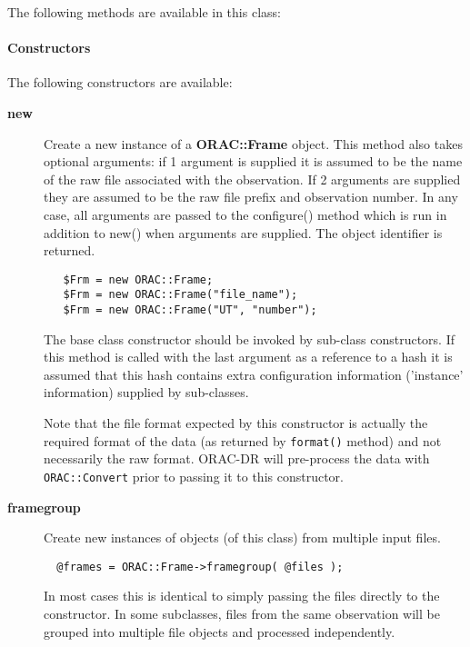 \begin{description}
The following methods are available in this class:

\paragraph*{Constructors\label{ORAC::Frame_Constructors}}


The following constructors are available:

\begin{description}

\item[{\textbf{new}}] \mbox{}

Create a new instance of a \textbf{ORAC::Frame} object.  This method also
takes optional arguments: if 1 argument is supplied it is assumed to
be the name of the raw file associated with the observation.  If 2
arguments are supplied they are assumed to be the raw file prefix and
observation number.  In any case, all arguments are passed to the
configure() method which is run in addition to new() when arguments
are supplied.  The object identifier is returned.

\begin{verbatim}
   $Frm = new ORAC::Frame;
   $Frm = new ORAC::Frame("file_name");
   $Frm = new ORAC::Frame("UT", "number");
\end{verbatim}


The base class constructor should be invoked by sub-class constructors.
If this method is called with the last argument as a reference to
a hash it is assumed that this hash contains extra configuration
information ('instance' information) supplied by sub-classes.



Note that the file format expected by this constructor is actually the
required format of the data (as returned by \texttt{format()} method) and not
necessarily the raw format.  ORAC-DR will pre-process the data with
\texttt{ORAC::Convert} prior to passing it to this constructor.


\item[{\textbf{framegroup}}] \mbox{}

Create new instances of objects (of this class) from multiple
input files.

\begin{verbatim}
  @frames = ORAC::Frame->framegroup( @files );
\end{verbatim}


In most cases this is identical to simply passing the files directly
to the constructor. In some subclasses, files from the same
observation will be grouped into multiple file objects and processed
independently.




\end{description}
\end{description}
